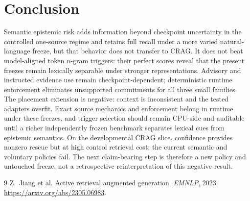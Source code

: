 \documentclass[11pt]{article}
\begin{document}
\section{Conclusion}
Semantic epistemic risk adds information beyond checkpoint uncertainty in the
controlled one-source regime and retains full recall under a more varied
natural-language freeze, but that behavior does not transfer to CRAG. It does
not beat model-aligned token $n$-gram triggers:
their perfect scores reveal that the present freezes remain lexically
separable under stronger representations. Advisory and instructed evidence
use remain checkpoint-dependent; deterministic runtime enforcement eliminates
unsupported commitments for all three small families. The placement extension
is negative: context is inconsistent and the tested adapters overfit. Exact
source mechanics and enforcement belong in runtime under these freezes, and
trigger selection should remain CPU-side and auditable until a richer
independently frozen benchmark separates lexical cues from epistemic semantics.
On the developmental CRAG slice, confidence provides nonzero rescue but at high
control retrieval cost; the current semantic and voluntary policies fail. The
next claim-bearing step is therefore a new policy and untouched freeze, not a
retrospective reinterpretation of this negative result.

\begin{thebibliography}{9}
Z.~Jiang et al. Active retrieval augmented generation. \emph{EMNLP}, 2023.
\url{https://arxiv.org/abs/2305.06983}.
\end{thebibliography}
\end{document}

